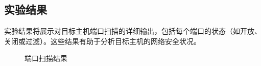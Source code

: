 \documentclass[UTF8,titlepage]{ctexart}
\numberwithin{figure}{section}
\begin{document}
\subsection{实验结果}
实验结果将展示对目标主机端口扫描的详细输出，包括每个端口的状态（如开放、关闭或过滤）。这些结果有助于分析目标主机的网络安全状况。
\begin{figure}[H]
\centering
 \caption{端口扫描结果}
 \label{}
\end{figure}
\clearpage
\end{document}
